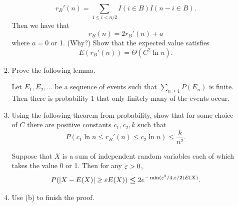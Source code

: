 \begin{enumerate}
\begin{enumerate}
\[r_B'(n)=\sum_{1\leq i<n/2} I(i\in B)I(n-i\in B).\]
Then we have that
\[r_B(n)=2r_B'(n) + a\]
where $a=0$ or 1. (Why?) Show that the expected value satisfies
\[E(r_B'(n))=\Theta(C^2\ln n).\]
\item Prove the following lemma.
\begin{lem}
Let $E_1,E_2,\ldots$ be a sequence of events such that $\sum_{n\geq 1} P(E_n)$ is finite. Then there is probability 1 that only finitely many of the events occur.
\end{lem}
\item Using the following theorem from probability, 
show that for some choice of $C$ there are positive constants $c_1,c_2,k$ such that
\[
P(c_1\ln n \leq r_B'(n)\leq c_2\ln n)\leq \frac{k}{n^2}.
\]
\begin{thm}
Suppose that $X$ is a sum of independent random variables each of which takes the value 0 or 1. Then for any $\varepsilon>0$,
\[P(|X-E(X)|\geq \varepsilon E(X))\boldsymbol \leq 2e^{-\min(\varepsilon^2/4,\varepsilon/2)E(X)}.\]
\end{thm}
\item Use (b) to finish the proof.
\end{enumerate}
\end{enumerate}
\pagebreak
